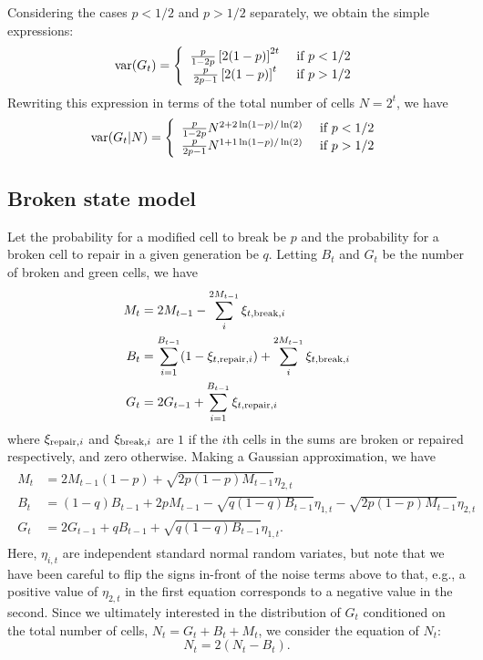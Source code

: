 \documentclass{article}
\begin{document}
Considering the cases $p<1/2$ and $p>1/2$ separately, we obtain the simple expressions:  
\begin{equation}
{\rm var}(G_t) = \left\{\begin{array}{cc} 
\frac{p}{1-2p} \left[2(1-p)\right]^{2t}& \text{ if } p<1/2\\
\frac{p}{2p-1} \left[2(1-p)\right]^{t}& \text{ if } p>1/2
\end{array}\right.
\end{equation}
Rewriting this expression in terms of the total number of cells $N = 2^t$, we have
\begin{equation}
{\rm var}(G_t|N) = \left\{\begin{array}{cc} 
\frac{p}{1-2p} N^{2 + 2 \ln(1-p)/\ln(2)}& \text{ if } p<1/2\\
\frac{p}{2p-1} N^{1+ 1 \ln(1-p)/\ln(2)}& \text{ if } p>1/2
\end{array}\right.
\end{equation}


\subsection{Broken state model}

Let the probability for a modified cell to break be $p$ and the probability for a broken cell to repair in a given generation be $q$. Letting $B_t$ and $G_t$ be the number of broken and green cells, we have
\begin{align}
M_t &= 2M_{t-1} -  \sum_{i}^{2M_{t-1}}\xi_{t,{\rm break},i}\\
B_t &= \sum_{i=1}^{B_{t-1}}(1-\xi_{t,{\rm repair},i}) + \sum_{i}^{2M_{t-1}}\xi_{t,{\rm break},i}\\
G_t &=2G_{t-1} + \sum_{i=1}^{B_{t-1}}\xi_{t,{\rm repair},i} 
\end{align}
where $\xi_{{\rm repair},i}$ and $\xi_{{\rm break},i}$ are $1$ if the $i$th cells in the sums are broken or repaired respectively, and zero otherwise. Making a Gaussian approximation, we have 
\begin{align}
\begin{split}\label{MBGt}
M_t &= 2M_{t-1}(1 - p)+ \sqrt{2p(1-p)M_{t-1}} \eta_{2,t}\\
B_t &= (1-q)B_{t-1} +2pM_{t-1} - \sqrt{q(1-q)B_{t-1}}\eta_{1,t} - \sqrt{2p(1-p)M_{t-1}} \eta_{2,t}\\
G_t &=2G_{t-1} + qB_{t-1}+\sqrt{q(1-q)B_{t-1}}\eta_{1,t}.
\end{split}
\end{align}
Here, $\eta_{i,t}$ are independent standard normal random variates, but note that we have been careful to flip the signs in-front of the noise terms above to that, e.g., a positive value of $\eta_{2,t}$ in the first equation corresponds to a negative value in the second. Since we ultimately interested in the distribution of $G_t$ conditioned on the total number of cells, $N_t = G_t + B_t + M_t$, we consider the equation of $N_t$: 
\begin{equation}
N_t = 2(N_t - B_t).
\end{equation}
\end{document}
